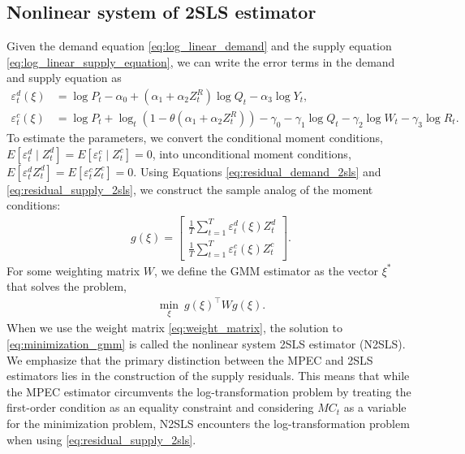 \documentclass[11pt, a4paper]{article}
\begin{document}
\subsection{Nonlinear system of 2SLS estimator}\label{sec:n2sls}
Given the demand equation \eqref{eq:log_linear_demand} and the supply equation \eqref{eq:log_linear_supply_equation}, we can write the error terms in the demand and supply equation as
\begin{align}
    {\varepsilon}_t^d(\xi) & =  \log P_{t} - \alpha_0 + (\alpha_1 + \alpha_2 Z^{R}_{t}) \log Q_t - \alpha_3 \log Y_t \label{eq:residual_demand_2sls}, \\
    {\varepsilon}_t^c(\xi) & =  \log P_t + \log_{t}(1 - \theta(\alpha_1 + \alpha_2 Z^{R}_{t})) -\gamma_0 - \gamma_1 \log Q_t -  \gamma_2 \log W_{t} -\gamma_3 \log R_t \label{eq:residual_supply_2sls}.
\end{align}
To estimate the parameters, we convert the conditional moment conditions, $E[\varepsilon_t^d\mid Z_t^d] = E[\varepsilon_t^c\mid Z_t^c]=0$, into unconditional moment conditions, $E[\varepsilon_t^d Z_t^d] = E[\varepsilon_t^cZ_t^c]=0$.
Using Equations \eqref{eq:residual_demand_2sls} and \eqref{eq:residual_supply_2sls}, we construct the sample analog of the moment conditions:
\begin{align*}
    g(\xi) = \left[\begin{array}{l}
    \frac{1}{T}\sum_{t=1}^T{\varepsilon}^{d}_{t}(\xi)Z_{t}^{d} \\
    \frac{1}{T}\sum_{t=1}^T{\varepsilon}^{c}_{t}(\xi)Z_{t}^{c}
    \end{array}\right].
\end{align*}
For some weighting matrix $W$, we define the GMM estimator as the vector $\xi^*$ that solves the problem,
\begin{align}
    \min_{\xi}\ g(\xi)^\top W g(\xi) \label{eq:minimization_gmm}. 
\end{align}
When we use the weight matrix \eqref{eq:weight_matrix}, the solution to \eqref{eq:minimization_gmm} is called the nonlinear system 2SLS estimator (N2SLS). 
We emphasize that the primary distinction between the MPEC and 2SLS estimators lies in the construction of the supply residuals. This means that while the MPEC estimator circumvents the log-transformation problem by treating the first-order condition as an equality constraint and considering $MC_t$ as a variable for the minimization problem, N2SLS encounters the log-transformation problem when using \eqref{eq:residual_supply_2sls}.
\end{document}

